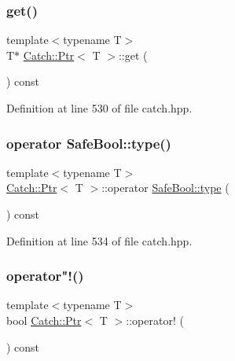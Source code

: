 \subsubsection{\texorpdfstring{get()}{get()}}
{\footnotesize\ttfamily template$<$typename T$>$ \\
T$\ast$ \hyperlink{class_catch_1_1_ptr}{Catch\+::\+Ptr}$<$ T $>$\+::get (\begin{DoxyParamCaption}{ }\end{DoxyParamCaption}) const\hspace{0.3cm}{\ttfamily [inline]}}



Definition at line 530 of file catch.\+hpp.

\hypertarget{class_catch_1_1_ptr_a102838cb25643586679e12efca26a3af}{}\label{class_catch_1_1_ptr_a102838cb25643586679e12efca26a3af} 
\subsubsection{\texorpdfstring{operator Safe\+Bool\+::type()}{operator SafeBool::type()}}
{\footnotesize\ttfamily template$<$typename T$>$ \\
\hyperlink{class_catch_1_1_ptr}{Catch\+::\+Ptr}$<$ T $>$\+::operator \hyperlink{class_catch_1_1_safe_bool_a39eef9baed296299d625a54d54a2a958}{Safe\+Bool\+::type} (\begin{DoxyParamCaption}{ }\end{DoxyParamCaption}) const\hspace{0.3cm}{\ttfamily [inline]}}



Definition at line 534 of file catch.\+hpp.

\hypertarget{class_catch_1_1_ptr_a85c4fe6cebf2a69d0416020b65714360}{}\label{class_catch_1_1_ptr_a85c4fe6cebf2a69d0416020b65714360} 
\subsubsection{\texorpdfstring{operator"!()}{operator!()}}
{\footnotesize\ttfamily template$<$typename T$>$ \\
bool \hyperlink{class_catch_1_1_ptr}{Catch\+::\+Ptr}$<$ T $>$\+::operator! (\begin{DoxyParamCaption}{ }\end{DoxyParamCaption}) const\hspace{0.3cm}{\ttfamily [inline]}}



